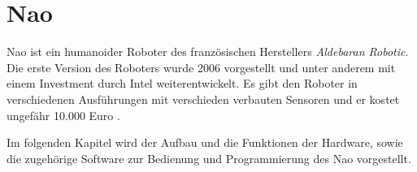 \chapter{Nao}\label{c:nao}
Nao ist ein humanoider Roboter des französischen Herstellers \textit{Aldebaran Robotic}. Die erste Version des Roboters wurde 2006 vorgestellt und unter anderem mit einem Investment durch Intel weiterentwickelt. Es gibt den Roboter in verschiedenen Ausführungen mit verschieden verbauten Sensoren und er kostet ungefähr 10.000 Euro \cite{ws:aldebaran}.

Im folgenden Kapitel wird der Aufbau und die Funktionen der Hardware, sowie die zugehörige Software zur Bedienung und Programmierung des Nao vorgestellt.




